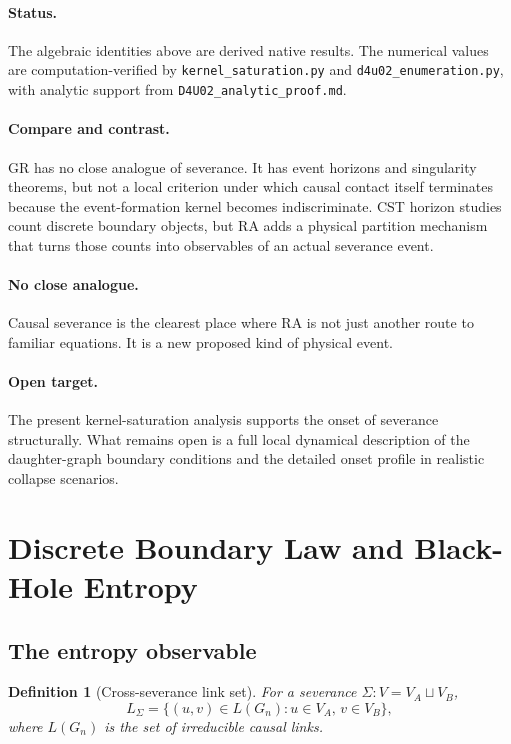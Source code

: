 \documentclass[11pt]{article}
\newtheorem{definition}{Definition}
\begin{document}
\paragraph{Status.} The algebraic identities above are derived native results. The numerical values are computation-verified by \texttt{kernel\_saturation.py} and \texttt{d4u02\_enumeration.py}, with analytic support from \texttt{D4U02\_analytic\_proof.md}.

\paragraph{Compare and contrast.} GR has no close analogue of severance. It has event horizons and singularity theorems, but not a local criterion under which causal contact itself terminates because the event-formation kernel becomes indiscriminate. CST horizon studies count discrete boundary objects, but RA adds a physical partition mechanism that turns those counts into observables of an actual severance event.

\paragraph{No close analogue.} Causal severance is the clearest place where RA is not just another route to familiar equations. It is a new proposed kind of physical event.

\paragraph{Open target.} The present kernel-saturation analysis supports the onset of severance structurally. What remains open is a full local dynamical description of the daughter-graph boundary conditions and the detailed onset profile in realistic collapse scenarios.

\section{Discrete Boundary Law and Black-Hole Entropy}
\label{sec:entropy}

\subsection{The entropy observable}

\begin{definition}[Cross-severance link set]
For a severance $\Sigma:V=V_A\sqcup V_B$,
\[
L_\Sigma=\{(u,v)\in L(G_n):u\in V_A,\,v\in V_B\},
\]
where $L(G_n)$ is the set of irreducible causal links.
\end{definition}
\end{document}
